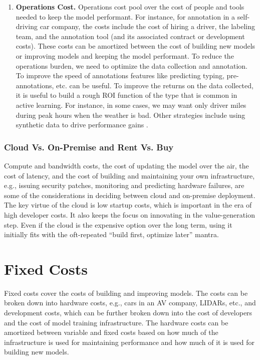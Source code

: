 \documentclass[12pt, letterpaper]{article}
\begin{document}
\begin{enumerate}
    \item \textbf{Operations Cost.} Operations cost pool over the cost of people and tools needed to keep the model performant. For instance, for annotation in a self-driving car company, the costs include the cost of hiring a driver, the labeling team, and the annotation tool (and its associated contract or development costs). These costs can be amortized between the cost of building new models or improving models and keeping the model performant. To reduce the operations burden, we need to optimize the data collection and annotation. To improve the speed of annotations features like predicting typing, pre-annotations, etc. can be useful. To improve the returns on the data collected, it is useful to build a rough ROI function of the type that is common in active learning. For instance, in some cases, we may want only driver miles during peak hours when the weather is bad. Other strategies include using synthetic data to drive performance gains \citep{sagers2022improving}.

\end{enumerate}

\subsubsection{Cloud Vs. On-Premise and Rent Vs. Buy}
Compute and bandwidth costs, the cost of updating the model over the air,  the cost of latency, and the cost of building and maintaining your own infrastructure, e.g., issuing security patches, monitoring and predicting hardware failures, are some of the considerations in deciding between cloud and on-premise deployment. The key virtue of the cloud is low startup costs, which is important in the era of high developer costs. It also keeps the focus on innovating in the value-generation step. Even if the cloud is the expensive option over the long term, using it initially fits with the oft-repeated “build first, optimize later” mantra.

\section{Fixed Costs}
Fixed costs cover the costs of building and improving models. The costs can be broken down into hardware costs, e.g., cars in an AV company, LIDARs, etc., and development costs, which can be further broken down into the cost of developers and the cost of model training infrastructure. The hardware costs can be amortized between variable and fixed costs based on how much of the infrastructure is used for maintaining performance and how much of it is used for building new models.
\end{document}
